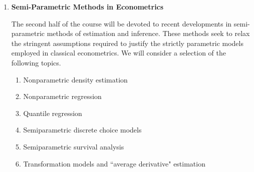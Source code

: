 \begin{enumerate}
\item {\bf Semi-Parametric Methods in Econometrics}

The second half of the course will be devoted to recent developments in 
semi-parametric methods of estimation and inference.  These methods seek to 
relax the stringent assumptions required to justify the strictly parametric 
models employed in classical econometrics.  We will consider a selection of
the following topics.

\begin{enumerate}
\item Nonparametric density estimation
\item Nonparametric regression
\item Quantile regression
\item Semiparametric discrete choice models
\item Semiparametric survival analysis
\item Transformation models and ``average derivative" estimation
\end{enumerate}


\end{enumerate}

